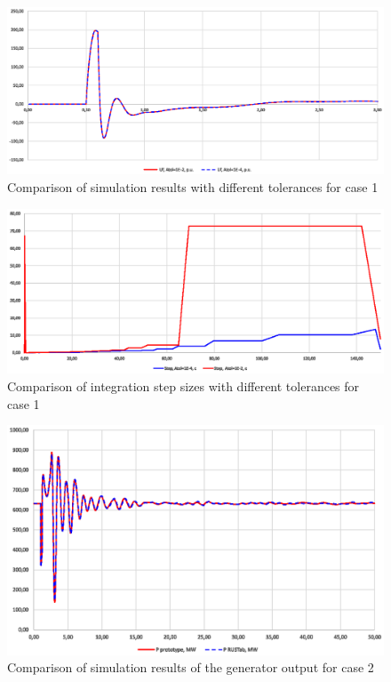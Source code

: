 \documentclass[lettersize,journal]{IEEEtran}
\begin{document}
\begin{figure}[htbp]
	\centering
	\includegraphics[width=\columnwidth]{case1atols.eps}
	\caption{Comparison of simulation results with different tolerances for case 1}
	\label{case1atols}
\end{figure}

\begin{figure}[htbp]
	\centering
	\includegraphics[width=\columnwidth]{case1atolsstep.eps}
	\caption{Comparison of integration step sizes with different tolerances for case 1}
	\label{case1atols}
\end{figure}


\begin{figure}[htbp]
	\centering
	\includegraphics[width=\columnwidth]{case2state.eps}
	\caption{Comparison of simulation results of the generator output for case 2}
	\label{case2state}
\end{figure}
\end{document}
